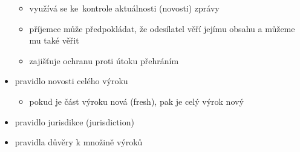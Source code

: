\begin{itemize}
    \begin{itemize}
        \item využívá se ke~kontrole aktuálnosti (novosti) zprávy
        \item příjemce může předpokládat, že odesílatel věří jejímu obsahu a můžeme mu také věřit
        \item zajišťuje ochranu proti útoku přehráním
    \end{itemize}
    \item pravidlo novosti celého výroku
    \begin{itemize}
        \item pokud je část výroku nová (fresh), pak je celý výrok nový
    \end{itemize}
    \item pravidlo jurisdikce (jurisdiction)
    \item pravidla důvěry k množině výroků
\end{itemize}
